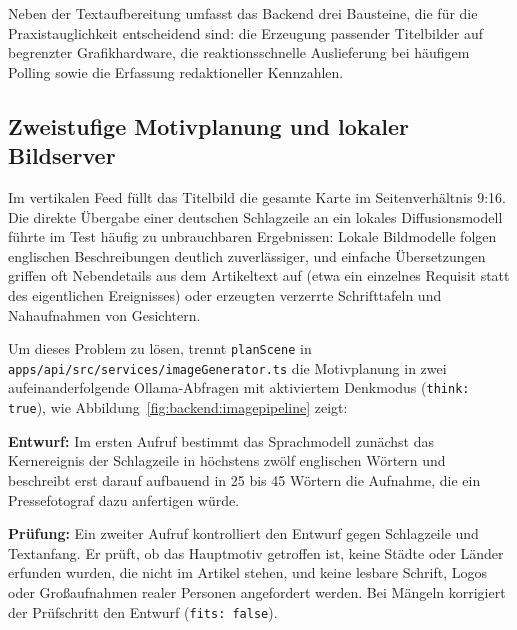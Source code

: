 Neben der Textaufbereitung umfasst das Backend drei Bausteine, die für die Praxistauglichkeit entscheidend sind: die Erzeugung passender Titelbilder auf begrenzter Grafikhardware, die reaktionsschnelle Auslieferung bei häufigem Polling sowie die Erfassung redaktioneller Kennzahlen.

\subsection{Zweistufige Motivplanung und lokaler Bildserver}

Im vertikalen Feed füllt das Titelbild die gesamte Karte im Seitenverhältnis 9:16.
Die direkte Übergabe einer deutschen Schlagzeile an ein lokales Diffusionsmodell führte im Test häufig zu unbrauchbaren Ergebnissen: Lokale Bildmodelle folgen englischen Beschreibungen deutlich zuverlässiger, und einfache Übersetzungen griffen oft Nebendetails aus dem Artikeltext auf (etwa ein einzelnes Requisit statt des eigentlichen Ereignisses) oder erzeugten verzerrte Schrifttafeln und Nahaufnahmen von Gesichtern.

Um dieses Problem zu lösen, trennt \texttt{planScene} in \texttt{apps/api/src/services/imageGenerator.ts} die Motivplanung in zwei aufeinanderfolgende Ollama-Abfragen mit aktiviertem Denkmodus (\texttt{think: true}), wie Abbildung~\ref{fig:backend:imagepipeline} zeigt:
\begin{compactenum}
    \item \textbf{Entwurf:} Im ersten Aufruf bestimmt das Sprachmodell zunächst das Kernereignis der Schlagzeile in höchstens zwölf englischen Wörtern und beschreibt erst darauf aufbauend in 25 bis 45 Wörtern die Aufnahme, die ein Pressefotograf dazu anfertigen würde.
    \item \textbf{Prüfung:} Ein zweiter Aufruf kontrolliert den Entwurf gegen Schlagzeile und Textanfang. Er prüft, ob das Hauptmotiv getroffen ist, keine Städte oder Länder erfunden wurden, die nicht im Artikel stehen, und keine lesbare Schrift, Logos oder Großaufnahmen realer Personen angefordert werden. Bei Mängeln korrigiert der Prüfschritt den Entwurf (\texttt{fits: false}).
\end{compactenum}

